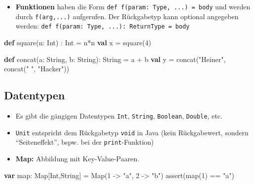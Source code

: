 \documentclass[]{article}
\newenvironment{Shaded}{}{}
\newcommand{\DecValTok}[1]{\textcolor[rgb]{0.25,0.63,0.44}{#1}}
\newcommand{\FunctionTok}[1]{\textcolor[rgb]{0.02,0.16,0.49}{#1}}
\newcommand{\KeywordTok}[1]{\textcolor[rgb]{0.00,0.44,0.13}{\textbf{#1}}}
\newcommand{\NormalTok}[1]{#1}
\newcommand{\StringTok}[1]{\textcolor[rgb]{0.25,0.44,0.63}{#1}}
\providecommand{\tightlist}{%
  \setlength{\itemsep}{0pt}\setlength{\parskip}{0pt}}
\begin{document}
\begin{itemize}
\tightlist
\item
  \textbf{Funktionen} haben die Form
  \texttt{def\ f(param:\ Type,\ ...)\ =\ body} und werden durch
  \texttt{f(arg,...)} aufgerufen. Der Rückgabetyp kann optional
  angegeben werden:
  \texttt{def\ f(param:\ Type,\ ...):\ ReturnType\ =\ body}
\end{itemize}

\begin{Shaded}
\begin{Highlighting}[]
\KeywordTok{def} \FunctionTok{square}\NormalTok{(n: Int) : Int = n*n}
\KeywordTok{val}\NormalTok{ x = }\FunctionTok{square}\NormalTok{(}\DecValTok{4}\NormalTok{)}

\KeywordTok{def} \FunctionTok{concat}\NormalTok{(a: String, b: String): String = a + b}
\KeywordTok{val}\NormalTok{ y = }\FunctionTok{concat}\NormalTok{(}\StringTok{"Heiner"}\NormalTok{, }\FunctionTok{concat}\NormalTok{(}\StringTok{" "}\NormalTok{, }\StringTok{"Hacker"}\NormalTok{))}
\end{Highlighting}
\end{Shaded}

\hypertarget{datentypen}{%
\subsection{Datentypen}\label{datentypen}}

\begin{itemize}
\item
  Es gibt die gängigen Datentypen \texttt{Int}, \texttt{String},
  \texttt{Boolean}, \texttt{Double}, etc.
\item
  \texttt{Unit} entspricht dem Rückgabetyp \texttt{void} in Java (kein
  Rückgabewert, sondern ``Seiteneffekt'', bspw. bei der
  \texttt{print}-Funktion)
\item
  \textbf{Map:} Abbildung mit Key-Value-Paaren.
\end{itemize}

\begin{Shaded}
\begin{Highlighting}[]
\KeywordTok{var}\NormalTok{ map: Map[Int,String] = Map(}\DecValTok{1}\NormalTok{ {-}\textgreater{} }\StringTok{"a"}\NormalTok{, }\DecValTok{2}\NormalTok{ {-}\textgreater{} }\StringTok{"b"}\NormalTok{)}
\FunctionTok{assert}\NormalTok{(}\FunctionTok{map}\NormalTok{(}\DecValTok{1}\NormalTok{) == }\StringTok{"a"}\NormalTok{)}
\end{Highlighting}
\end{Shaded}
\end{document}
